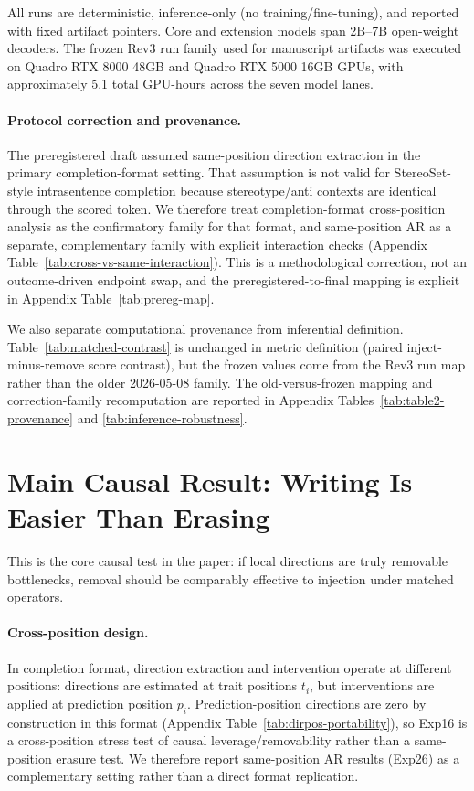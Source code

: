 All runs are deterministic, inference-only (no training/fine-tuning), and reported with fixed artifact pointers. Core and extension models span 2B--7B open-weight decoders. The frozen Rev3 run family used for manuscript artifacts was executed on Quadro RTX 8000 48GB and Quadro RTX 5000 16GB GPUs, with approximately 5.1 total GPU-hours across the seven model lanes.

\paragraph{Protocol correction and provenance.}
The preregistered draft assumed same-position direction extraction in the primary completion-format setting. That assumption is not valid for StereoSet-style intrasentence completion because stereotype/anti contexts are identical through the scored token. We therefore treat completion-format cross-position analysis as the confirmatory family for that format, and same-position AR as a separate, complementary family with explicit interaction checks (Appendix Table~\ref{tab:cross-vs-same-interaction}). This is a methodological correction, not an outcome-driven endpoint swap, and the preregistered-to-final mapping is explicit in Appendix Table~\ref{tab:prereg-map}.

We also separate computational provenance from inferential definition. Table~\ref{tab:matched-contrast} is unchanged in metric definition (paired inject-minus-remove score contrast), but the frozen values come from the Rev3 run map rather than the older 2026-05-08 family. The old-versus-frozen mapping and correction-family recomputation are reported in Appendix Tables~\ref{tab:table2-provenance} and \ref{tab:inference-robustness}.

\section{Main Causal Result: Writing Is Easier Than Erasing}
\label{sec:main-result}

This is the core causal test in the paper: if local directions are truly removable bottlenecks, removal should be comparably effective to injection under matched operators.

\paragraph{Cross-position design.}
In completion format, direction extraction and intervention operate at different positions: directions are estimated at trait positions $t_i$, but interventions are applied at prediction position $p_i$. Prediction-position directions are zero by construction in this format (Appendix Table~\ref{tab:dirpos-portability}), so Exp16 is a cross-position stress test of causal leverage/removability rather than a same-position erasure test. We therefore report same-position AR results (Exp26) as a complementary setting rather than a direct format replication.


